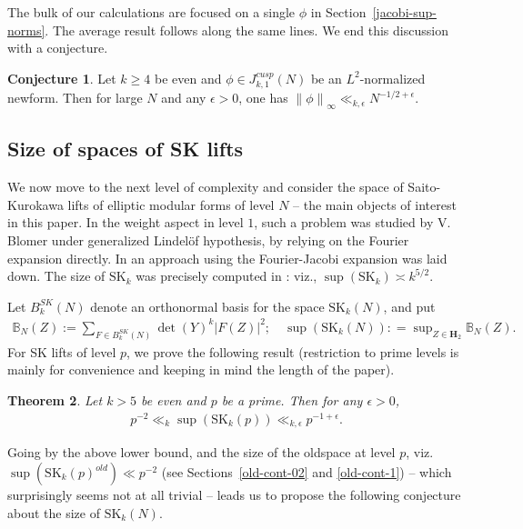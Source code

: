 \documentclass[11pt]{amsart}
\numberwithin{equation}{section}
\theoremstyle{plain}
\newtheorem{thm}{Theorem}[section]
\theoremstyle{definition}
\newtheorem{conj}[thm]{Conjecture}
\newcommand{\mf}{\mathbf}
\newcommand{\mrm}{\mathrm}
\newcommand*{\norm}[1]{\left\lVert#1\right\rVert}
\newcommand{\q}{\quad}
\newcommand{\sumn}{\sum \nolimits}
\newcommand{\jkn}{J^{cusp}_{k,1}(N)}
\newcommand{\skk}{\mrm{SK}_k}
\newcommand{\skkn}{\mrm{SK}_k(N)}
\newcommand{\skkp}{\mrm{SK}_k(p)}
\newcommand{\bkn}{\mathbb B_{N}(Z)}
\begin{document}
The bulk of our calculations are focused on a single $\phi$ in Section~\ref{jacobi-sup-norms}. The average result follows along the same lines. We end this discussion with a conjecture.
\begin{conj}
    Let $k \ge 4$ be even and $\phi\in\jkn$ be an $L^2$-normalized newform. Then for large $N$ and any $\epsilon>0$, one has $\norm{\phi}_\infty \ll_{k,\epsilon} N^{-1/2+\epsilon}$.
\end{conj}

\subsection{Size of spaces of SK lifts}
We now move to the next level of complexity and consider the space of Saito-Kurokawa lifts of elliptic modular forms of level $N$ -- the main objects of interest in this paper. In the weight aspect in level $1$, such a problem was studied by V. Blomer \cite{Bl} under generalized Lindel\"{o}f hypothesis, by relying on the Fourier expansion directly. In \cite{DS} an approach using the Fourier-Jacobi expansion was laid down. The size of $\skk$ was precisely computed in \cite{PASD}: viz., $\displaystyle \sup(\skk) \asymp k^{5/2}$.

Let $B_{k}^{SK}(N)$ denote an orthonormal basis for the space $\skkn$, and put
\begin{align}
    \bkn := \sumn_{F \in B_{k}^{SK}(N)} \det(Y)^k |F(Z)|^2; \q  \sup(\skkn) : = \sup\nolimits_{Z \in \mf H_2} \bkn .
\end{align}
For SK lifts of level $p$, we prove the following result (restriction to prime levels is mainly for convenience and keeping in mind the length of the paper).
\begin{thm}\label{thmsk}
   Let $k > 5$ be even and $p$ be a prime. Then for any $\epsilon>0$,
   \begin{align}
     p^{-2} \ll_k   \sup(\skkp) \ll_{k,\epsilon} p^{-1+\epsilon}.
   \end{align}
\end{thm}
Going by the above lower bound, and the size of the oldspace at level $p$, viz. $\displaystyle \sup(\skkp^{old}) \ll p^{-2}$ (see Sections~\ref{old-cont-02} and \ref{old-cont-1}) -- which surprisingly seems not at all trivial -- leads us to propose the following conjecture about the size of $\skkn$.
\end{document}
